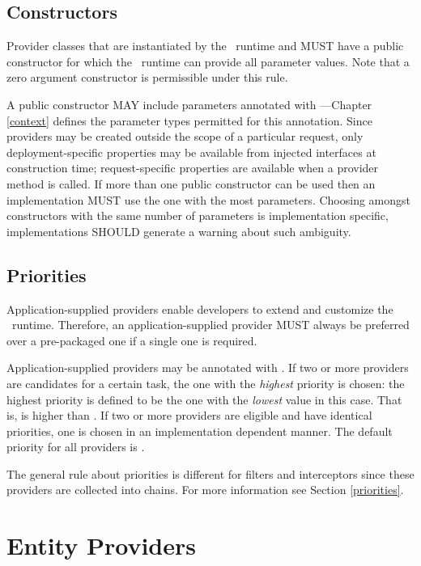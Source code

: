 \subsection{Constructors}
\label{provider_class_constructor}

Provider classes that are instantiated by the \jaxrs\ runtime and MUST have a public constructor for which the \jaxrs\ runtime can provide all parameter values. Note that a zero argument constructor is permissible under this rule.

A public constructor MAY include parameters annotated with \Context ---Chapter \ref{context} defines the parameter types permitted for this annotation. Since providers may be created outside the scope of a particular request, only deployment-specific properties may be available from injected interfaces at construction time; request-specific properties are available when a provider method is called. If more than one public constructor can be used then an implementation MUST use the one with the most parameters. Choosing amongst constructors with the same number of parameters is implementation specific, implementations SHOULD generate a warning about such ambiguity.

\subsection{Priorities}
\label{provider_priorities}

Application-supplied providers enable developers to extend and customize the \jaxrs\ runtime. Therefore, an application-supplied provider MUST always be preferred over a pre-packaged one if a single one is required.

Application-supplied providers may be annotated with \Priority. If two or more providers are candidates for a certain task, the one with the \emph{highest} priority is chosen: the highest priority is defined to be the one with the \emph{lowest} value in this case. That is,  is higher than . If two or more providers are eligible and have identical priorities, one is chosen in an implementation dependent manner. The default priority for all providers is . 

The general rule about priorities is different for filters and interceptors since these providers are collected into chains. For more information see Section \ref{priorities}.

\section{Entity Providers}
\label{entity_providers}

